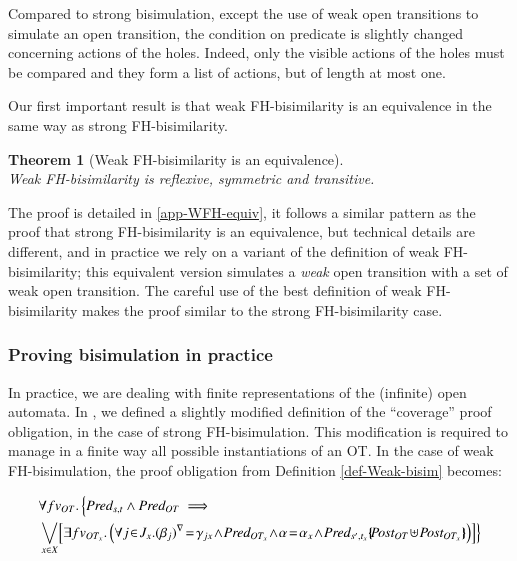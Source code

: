 \documentclass{elsarticle}
\newtheorem{thm}{Theorem}
\begin{document}
Compared to strong bisimulation, except the  use of weak open transitions to simulate an open transition, the condition on predicate is slightly changed concerning actions of the holes. Indeed, only the visible actions of the holes must be compared and they form a list of actions, but of length at most one.




Our first important result is that weak FH-bisimilarity is an equivalence in the same way as strong FH-bisimilarity.


\begin{thm}[Weak FH-bisimilarity is an equivalence]\label{thm-weak-equiv} ~\\Weak FH-bisimilarity is 
reflexive, symmetric and transitive.
\end{thm}
The proof  is detailed in  \ref{app-WFH-equiv}, it follows a similar pattern as the proof that strong FH-bisimilarity is an equivalence, but technical details are different, and in practice we rely on a variant of the definition of weak FH-bisimilarity; this equivalent version simulates a \emph{weak} open transition with a set of weak open transition. The careful use of the best definition of weak FH-bisimilarity makes the proof similar to the strong FH-bisimilarity case.

\subsubsection*{Proving bisimulation in practice}

In practice, we are dealing with finite representations of the (infinite) open automata. In \cite{hou:hal-02406098}, we defined a slightly modified definition of the ``coverage'' proof obligation, in the case of strong FH-bisimulation. This modification is required to manage in a finite way all possible instantiations of an OT. In the case of weak FH-bisimulation, the proof obligation from Definition \ref{def-Weak-bisim} becomes:
\begin{small}
      \begin{align*}
&\forall fv_{OT}.\, \Big\{ \Pred_{s,t} \land \Pred_{OT} \implies\\
& \bigvee_{x\in X}\!
  \left[\exists fv_{OT_x}.
    \left( \forall j\!\in\! J_x. \vis{\beta_j}\!=\!\gamma_{jx}\! \land\! \Pred_{OT_x}
     \!\land\! \alpha\!=\!\alpha_x\! \land\!  
     \Pred_{s',t_x}\subst{\Post_{OT}\!\uplus\!\Post_{OT_x}}\right)\right]\!\Big\}
\end{align*}
\end{small}
\end{document}
